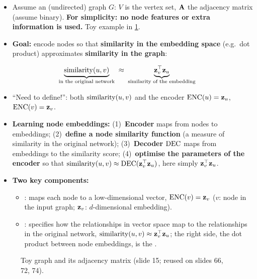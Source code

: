 \begin{itemize}
  \item Assume an (undirected) graph $G$: $V$ is the vertex set, $\mathbf{A}$ the
    adjacency matrix (assume binary). \textbf{For simplicity: no node features
    or extra information is used.} Toy example in \cref{fig:lec02-toy}.
  \item \textbf{Goal:} encode nodes so that \textbf{similarity in the embedding
    space} (e.g.\ dot product) approximates \textbf{similarity in the graph}:
\end{itemize}
\begin{equation}\label{eq:lec02-goal}
  \underbrace{\operatorname{similarity}(u,v)}_{\text{in the original network}}
  \;\approx\;
  \underbrace{\mathbf{z}_v^{\top}\mathbf{z}_u}_{\text{similarity of the embedding}}
\end{equation}
\begin{itemize}
  \item ``Need to define!'': both $\operatorname{similarity}(u,v)$ and the encoder
    $\operatorname{ENC}(u)=\mathbf{z}_u$, $\operatorname{ENC}(v)=\mathbf{z}_v$.
  \item \textbf{Learning node embeddings:}
    (1)~\textbf{Encoder} maps from nodes to embeddings;
    (2)~\textbf{define a node similarity function} (a measure of similarity in
    the original network);
    (3)~\textbf{Decoder} $\operatorname{DEC}$ maps from embeddings to the similarity score;
    (4)~\textbf{optimise the parameters of the encoder} so that
    $\operatorname{similarity}(u,v)\approx\operatorname{DEC}(\mathbf{z}_v^{\top}\mathbf{z}_u)$, here simply $\mathbf{z}_v^{\top}\mathbf{z}_u$.
  \item \textbf{Two key components:}
    \begin{itemize}
      \item {}: maps each node to a low-dimensional vector,
        $\operatorname{ENC}(v)=\mathbf{z}_v$ ($v$: node in the input graph; $\mathbf{z}_v$: $d$-dimensional
        embedding).
      \item {}: specifies how the relationships in vector
        space map to the relationships in the original network,
        $\operatorname{similarity}(u,v)\approx\mathbf{z}_v^{\top}\mathbf{z}_u$; the right side, the dot product
        between node embeddings, is the .
    \end{itemize}
\end{itemize}

\begin{figure}[htbp]
  \centering
  \caption{Toy graph and its adjacency matrix (slide 15; reused on slides 66, 72, 74).}
  \label{fig:lec02-toy}
\end{figure}

